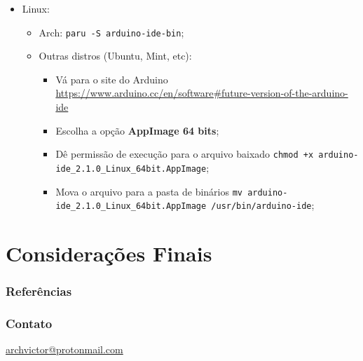 \documentclass[12pt]{beamer}
\begin{document}
\begin{frame}[allowframebreaks]
\begin{itemize}
        \framebreak%
        \item Linux:
        \begin{itemize}
            \item Arch: \texttt{paru -S arduino-ide-bin};
            \item Outras distros (Ubuntu, Mint, etc):
            \begin{itemize}
                \item Vá para o site do Arduino \url{https://www.arduino.cc/en/software\#future-version-of-the-arduino-ide}
                \item Escolha a opção \textbf{AppImage 64 bits};
                \item Dê permissão de execução para o arquivo baixado \texttt{chmod +x arduino-ide_2.1.0_Linux_64bit.AppImage};
                \item Mova o arquivo para a pasta de binários \texttt{mv arduino-ide_2.1.0_Linux_64bit.AppImage /usr/bin/arduino-ide};
            \end{itemize}
        \end{itemize}
    \end{itemize}

\end{frame}

\section{Considerações Finais}
\begin{frame}[allowframebreaks]
    \frametitle{Referências}
    
\end{frame}

\begin{frame}
    \frametitle{Contato}
    \centering
    \url{archvictor@protonmail.com}
\end{frame}
\end{document}

